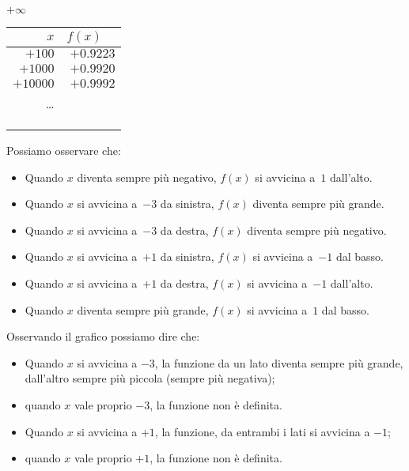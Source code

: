 \begin{esempio}
\begin{minipage}{.24\textwidth}
\begin{center}
\end{center}
\end{minipage}
\begin{minipage}{.24\textwidth}
\begin{center}
\(+\infty\)\\
\begin{tabular}{r|r}
\(x\) & \(f(x)\quad\)\\\hline
\(+100\) & \(+0.9223\) \\
\(+1000\) & \(+0.9920\) \\
\(+10000\) & \(+0.9992\) \\
\dots \\
&\\
&\\
&
\end{tabular}
\end{center}
\end{minipage}

\vspace{1em}
Possiamo osservare che:
\begin{itemize} [nosep]
 \item Quando \(x\) diventa sempre più negativo, 
\(f(x)\) si avvicina a~\(1\) dall'alto.
 \item Quando \(x\) si avvicina a~\(-3\) da sinistra, 
\(f(x)\) diventa sempre più grande.
 \item Quando \(x\) si avvicina a~\(-3\) da destra, 
\(f(x)\) diventa sempre più negativo.
 \item Quando \(x\) si avvicina a~\(+1\) da sinistra, 
\(f(x)\)  si avvicina a~\(-1\) dal basso.
 \item Quando \(x\) si avvicina a~\(+1\) da destra, 
\(f(x)\)  si avvicina a~\(-1\) dall'alto.
 \item Quando \(x\) diventa sempre più grande, 
\(f(x)\) si avvicina a~\(1\) dal basso.
\end{itemize}
\end{esempio}

Osservando il grafico possiamo dire che:

\begin{itemize} [nosep]
 \item 
Quando \(x\) si avvicina a \(-3\), la funzione 
da un lato diventa sempre più grande, 
dall'altro sempre più piccola (sempre più negativa);
 \item 
quando \(x\) vale proprio \(-3\), la funzione non è definita.
 \item 
Quando \(x\) si avvicina a \(+1\), la funzione, 
da entrambi i lati si avvicina a \(-1\);
 \item 
quando \(x\) vale proprio \(+1\), la funzione non è definita.
\end{itemize}

